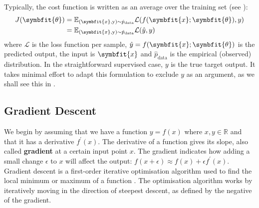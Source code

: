 Typically, the cost function is written as an average over the training set (see ):
\begin{equation}
\label{eqn:cost-fn-emp}
\begin{split}
    J(\symbfit{\theta})&=\mathbb{E}_{(\symbfit{x}, \mathrm{y}) \sim \hat{p}_{\mathrm{data}}} \mathcal{L}(f(\symbfit{x} ; \symbfit{\theta}), y)\\
    &= \mathbb{E}_{(\symbfit{x}, \mathrm{y}) \sim \hat{p}_{\mathrm{data}}} \mathcal{L}(\hat{y}, y)
\end{split}
\end{equation}
where $\mathcal L$ is the loss function per sample, $\hat{y} = f(\symbfit{x}; \symbfit{\theta})$ is the predicted output, the input is $\symbfit{x}$ and \(\hat{p}_{\mathrm{data}}\) is the empirical (observed) distribution. In the straightforward supervised case, $y$ is the true target output. It takes minimal effort to adapt this formulation to exclude $y$ as an argument, as we shall see this in .


\subsection{Gradient Descent}\label{sec:sgd}

We begin by assuming that we have a function $y = f(x)$ where $x, y \in \mathbb{R}$ and that it has a derivative $f^\prime(x)$. The derivative of a function gives its slope, also called \textbf{gradient} at a certain input point $x$. The gradient indicates how adding a small change $\epsilon$ to $x$ will affect the output: $f(x + \epsilon) \approx f(x) + \epsilon f^\prime(x)$. Gradient descent is a first-order iterative optimisation algorithm used to find the local minimum or maximum of a function \parencite{Kiefer1952, Robbins1951}. The optimisation algorithm works by iteratively moving in the direction of steepest descent, as defined by the negative of the gradient.

